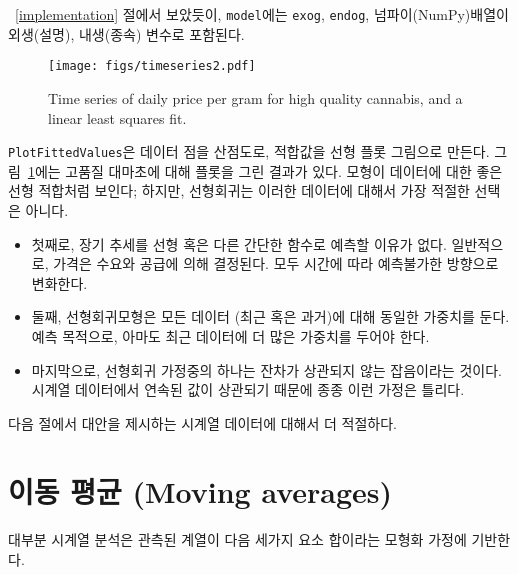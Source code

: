 ~\ref{implementation} 절에서 보았듯이, {\tt model}에는 {\tt exog}, {\tt endog}, 넘파이(NumPy)배열이 외생(설명), 내생(종속) 변수로 포함된다.

\begin{figure}
\centerline{\texttt{[image: figs/timeseries2.pdf]}}
\caption{Time series of daily price per gram for high quality cannabis,
and a linear least squares fit.}
\label{timeseries2}
\end{figure}

{\tt PlotFittedValues}은 데이터 점을 산점도로, 적합값을 선형 플롯 그림으로 만든다. 그림~\ref{timeseries2}에는 고품질 대마초에 대해 플롯을 그린 결과가 있다. 모형이 데이터에 대한 좋은 선형 적합처럼 보인다; 하지만, 선형회귀는 이러한 데이터에 대해서 가장 적절한 선택은 아니다.

\begin{itemize}

\item 첫째로, 장기 추세를 선형 혹은 다른 간단한 함수로 예측할 이유가 없다.
일반적으로, 가격은 수요와 공급에 의해 결정된다. 모두 시간에 따라 예측불가한 방향으로 변화한다.

\item 둘째, 선형회귀모형은 모든 데이터 (최근 혹은 과거)에 대해 동일한 가중치를 둔다. 예측 목적으로, 아마도 최근 데이터에 더 많은 가중치를 두어야 한다.

\item 마지막으로, 선형회귀 가정중의 하나는 잔차가 상관되지 않는 잡음이라는 것이다. 시계열 데이터에서 연속된 값이 상관되기 때문에 종종 이런 가정은 틀리다. 

\end{itemize}

다음 절에서 대안을 제시하는 시계열 데이터에 대해서 더 적절하다.

\section{이동 평균 (Moving averages)}

대부분 시계열 분석은 관측된 계열이 다음 세가지 요소 합이라는 모형화 가정에 기반한다.


